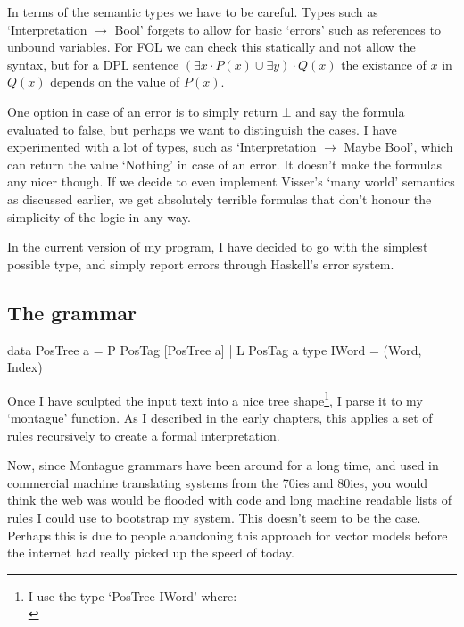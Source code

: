 \documentclass[12pt]{article}
\begin{document}
In terms of the semantic types we have to be careful. Types such as `Interpretation $\rightarrow$ Bool' forgets to allow for basic `errors' such as references to unbound variables. For FOL we can check this statically and not allow the syntax, but for a DPL sentence $(\exists x\cdot P(x) \cup \exists y)\cdot Q(x)$ the existance of $x$ in $Q(x)$ depends on the value of $P(x)$.

One option in case of an error is to simply return $\bot$ and say the formula evaluated to false, but perhaps we want to distinguish the cases. I have experimented with a lot of types, such as `Interpretation $\rightarrow$ Maybe Bool', which can return the value `Nothing' in case of an error. It doesn't make the formulas any nicer though. If we decide to even implement Visser's `many world' semantics as discussed earlier, we get absolutely terrible formulas that don't honour the simplicity of the logic in any way.

In the current version of my program, I have decided to go with the simplest possible type, and simply report errors through Haskell's error system.

\subsection{The grammar}

\newsavebox{\LstBox}
\begin{lrbox}{\LstBox}
\begin{haskell}
data PosTree a = P PosTag [PosTree a] | L PosTag a
type IWord = (Word, Index)
\end{haskell}
\end{lrbox}

Once I have sculpted the input text into a nice tree shape\footnote{I use the type `PosTree IWord' where:\\
\usebox{\LstBox}}, I parse it to my `montague' function. As I described in the early chapters, this applies a set of rules recursively to create a formal interpretation.

Now, since Montague grammars have been around for a long time, and used in commercial machine translating systems from the 70ies and 80ies, you would think the web was would be flooded with code and long machine readable lists of rules I could use to bootstrap my system. This doesn't seem to be the case. Perhaps this is due to people abandoning this approach for vector models before the internet had really picked up the speed of today.
\end{document}
